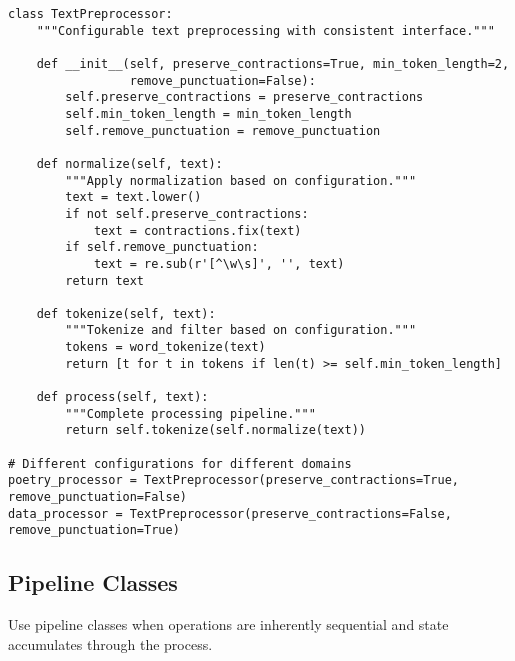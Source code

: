 \documentclass[11pt,a4paper]{article}
\begin{document}
\begin{lstlisting}[caption=Namespace classes for shared configuration]
class TextPreprocessor:
    """Configurable text preprocessing with consistent interface."""
    
    def __init__(self, preserve_contractions=True, min_token_length=2, 
                 remove_punctuation=False):
        self.preserve_contractions = preserve_contractions
        self.min_token_length = min_token_length
        self.remove_punctuation = remove_punctuation
    
    def normalize(self, text):
        """Apply normalization based on configuration."""
        text = text.lower()
        if not self.preserve_contractions:
            text = contractions.fix(text)
        if self.remove_punctuation:
            text = re.sub(r'[^\w\s]', '', text)
        return text
    
    def tokenize(self, text):
        """Tokenize and filter based on configuration."""
        tokens = word_tokenize(text)
        return [t for t in tokens if len(t) >= self.min_token_length]
    
    def process(self, text):
        """Complete processing pipeline."""
        return self.tokenize(self.normalize(text))

# Different configurations for different domains
poetry_processor = TextPreprocessor(preserve_contractions=True, remove_punctuation=False)
data_processor = TextPreprocessor(preserve_contractions=False, remove_punctuation=True)
\end{lstlisting}

\subsection{Pipeline Classes}

Use pipeline classes when operations are inherently sequential and state accumulates through the process.
\end{document}
